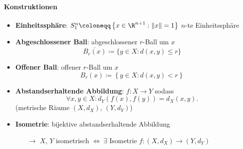 \paragraph{Konstruktionen}
\begin{itemize}
  \item \textbf{Einheitssphäre}: \( S_1^n \coloneqq \left \{ x \in \R^{n+1} : \left\Vert x \right\Vert = 1 \right \} \) \( n \)-te Einheitssphäre
  \item \textbf{Abgeschlossener Ball}: abgeschlossener \( r \)-Ball um \( x \)
  \begin{equation*}
    \overline{B_r(x)} \coloneqq \{ y \in X : d(x,y) \leq r \}
  \end{equation*}
  \item \textbf{Offener Ball}: offener \( r \)-Ball um \( x \)
  \begin{equation*}
    B_r(x) \coloneqq \left \{ y \in X : d(x,y) < r \right \}
  \end{equation*}
  \item \textbf{Abstandserhaltende Abbildung}: \( f: X \to Y \) sodass
  \begin{equation*}
    \forall x, y \in X: d_Y(f(x), f(y)) = d_X(x, y)\text{.}
  \end{equation*} 
  (metrische Räume \( (X, d_X) \), \( (Y, d_Y) \))
  \item \textbf{Isometrie}: bijektive abstandserhaltende Abbildung
  \begin{itemize}
    \item[\( \to \)] \( X \), \( Y \) isometrisch \( \Leftrightarrow \ \exists \) Isometrie \( f: (X, d_X) \to (Y, d_Y) \)
  \end{itemize}
\end{itemize}